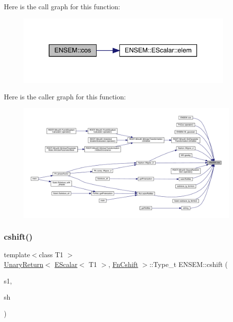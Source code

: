 Here is the call graph for this function\+:\nopagebreak
\begin{figure}[H]
\begin{center}
\leavevmode
\includegraphics[width=308pt]{d4/dca/group__escalar_ga841db2f3f6d6a553733b1b75a638f052_cgraph}
\end{center}
\end{figure}
Here is the caller graph for this function\+:
\nopagebreak
\begin{figure}[H]
\begin{center}
\leavevmode
\includegraphics[width=350pt]{d4/dca/group__escalar_ga841db2f3f6d6a553733b1b75a638f052_icgraph}
\end{center}
\end{figure}
\mbox{\label{group__escalar_ga4a9bfa7287ccf8fef9605aa9e9a44884}} 
\subsubsection{\texorpdfstring{cshift()}{cshift()}}
{\footnotesize\ttfamily template$<$class T1 $>$ \\
\mbox{\hyperlink{structENSEM_1_1UnaryReturn}{Unary\+Return}}$<$ \mbox{\hyperlink{classENSEM_1_1EScalar}{E\+Scalar}}$<$ T1 $>$, \mbox{\hyperlink{structENSEM_1_1FnCshift}{Fn\+Cshift}} $>$\+::Type\+\_\+t E\+N\+S\+E\+M\+::cshift (\begin{DoxyParamCaption}\item[{const \mbox{\hyperlink{classENSEM_1_1EScalar}{E\+Scalar}}$<$ T1 $>$ \&}]{s1,  }\item[{int}]{sh }\end{DoxyParamCaption})\hspace{0.3cm}{\ttfamily [inline]}}


